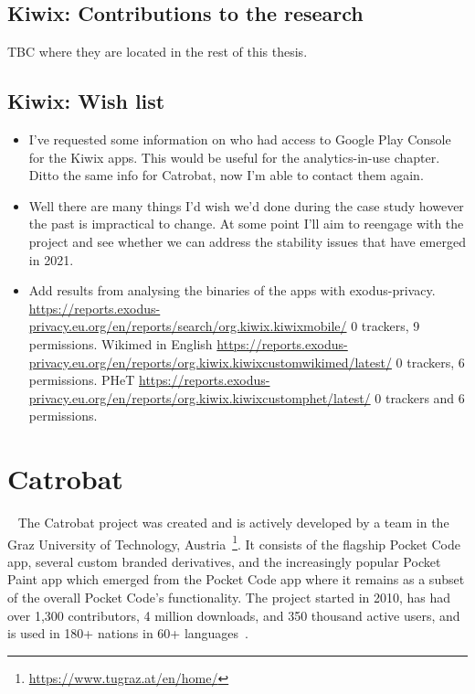 \subsection{Kiwix: Contributions to the research}
TBC where they are located in the rest of this thesis.

\subsection*{Kiwix: Wish list}
{\small
\begin{itemize}
    \itemsep0em
    \item I've requested some information on who had access to Google Play Console for the Kiwix apps. This would be useful for the analytics-in-use chapter. Ditto the same info for Catrobat, now I'm able to contact them again.
    \item Well there are many things I'd wish we'd done during the case study however the past is impractical to change. At some point I'll aim to reengage with the project and see whether we can address the stability issues that have emerged in 2021.
    \item Add results from analysing the binaries of the apps with exodus-privacy. \url{https://reports.exodus-privacy.eu.org/en/reports/search/org.kiwix.kiwixmobile/} 0 trackers, 9 permissions. Wikimed in English \url{https://reports.exodus-privacy.eu.org/en/reports/org.kiwix.kiwixcustomwikimed/latest/} 0 trackers, 6 permissions. PHeT \url{https://reports.exodus-privacy.eu.org/en/reports/org.kiwix.kiwixcustomphet/latest/} 0 trackers and 6 permissions.
\end{itemize}
}

\clearpage


\section{Catrobat}~\label{case-study-overview-catrobat}
The Catrobat project was created and is actively developed by a team in the Graz University of Technology, Austria~\footnote{\url{https://www.tugraz.at/en/home/}}. It consists of the flagship Pocket Code app, several custom branded derivatives, and the increasingly popular Pocket Paint app which emerged from the Pocket Code app where it remains as a subset of the overall Pocket Code's functionality. The project started in 2010, has had over 1,300 contributors, 4 million downloads, and 350 thousand active users, and is used in 180+ nations in 60+ languages~\citep{catrobat_project}.

